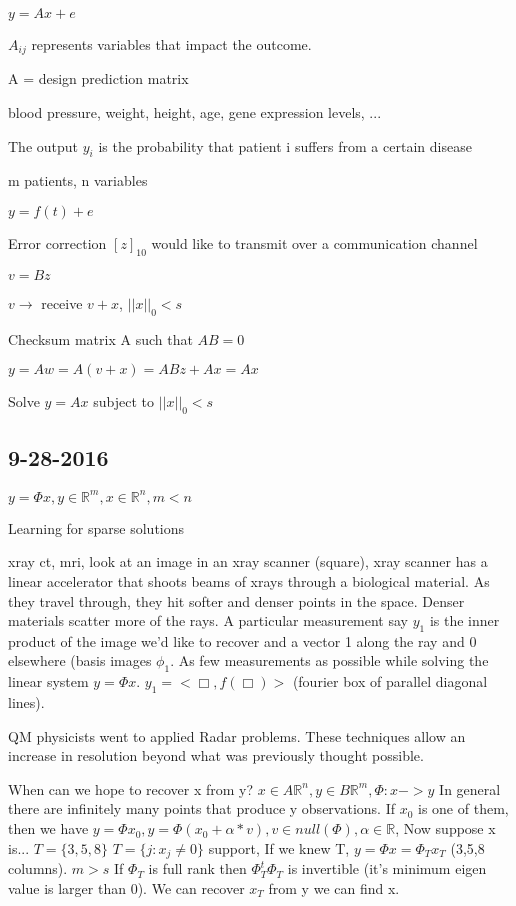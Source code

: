 \documentclass[12pt,letterpaper]{report}
\begin{document}
$y = Ax + e$

$A_{ij}$ represents variables that impact the outcome.

A = design prediction matrix

blood pressure, weight, height, age, gene expression levels, ...

The output $y_i$ is the probability that patient i suffers from a certain disease

m patients, n variables

$y = f(t) + e$

Error correction $[z]_{10}$ would like to transmit over a communication channel

$v = B z$

$v \rightarrow$ receive $v + x$, $||x||_0 < s$

Checksum matrix A such that $AB=0$

$y = Aw = A(v+x) = ABz + Ax = Ax$

Solve $y = Ax$ subject to $||x||_0 < s$

\subsection*{9-28-2016}
$y = \Phi x, y \in \mathbb{R}^m, x \in \mathbb{R}^n, m < n$

Learning for sparse solutions

xray ct, mri, look at an image in an xray scanner (square), xray scanner has a linear accelerator that shoots beams of xrays through a biological material. As they travel through, they hit softer and denser points in the space.  Denser materials scatter more of the rays.  A particular measurement say $y_1$ is the inner product of the image we'd like to recover and a vector 1 along the ray and 0 elsewhere (basis images $\phi_1$.  As few measurements as possible while solving the linear system $y = \Phi x$. $y_1 = < \Box, f(\Box) >$ (fourier box of parallel diagonal lines).

QM physicists went to applied Radar problems.  These techniques allow an increase in resolution beyond what was previously thought possible.

When can we hope to recover x from y?  $x \in A \mathbb{R}^n, y \in B \mathbb{R}^m, \Phi : x -> y$  In general there are infinitely many points that produce y observations.  If $x_0$ is one of them, then we have $y = \Phi x_0, y = \Phi (x_0 + \alpha * v), v \in null(\Phi),  \alpha \in \mathbb{R}$, Now suppose x is... $T = \{ 3,5,8 \}$  $T = \{j : x_j \neq 0 \}$ support, If we knew T, $y = \Phi x = \Phi_T x_T$ (3,5,8 columns).  $m > s$ If $\Phi_T$ is full rank then $\Phi_T^t \Phi_T$ is invertible (it's minimum eigen value is larger than 0).  We can recover $x_T$ from y we can find x.
\end{document}
